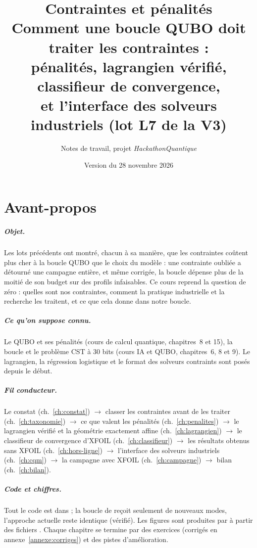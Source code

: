 \documentclass[11pt,a4paper]{report}
\title{\textbf{Contraintes et pénalités}\\[0.4em]\large Comment une boucle QUBO doit traiter les contraintes :\\ pénalités, lagrangien vérifié, classifieur de convergence,\\ et l'interface des solveurs industriels (lot L7 de la V3)}
\author{Notes de travail, projet \emph{HackathonQuantique}}
\date{Version du 28 novembre 2026}
\begin{document}
\maketitle
{}

\chapter*{Avant-propos}
\paragraph{Objet.} Les lots précédents ont montré, chacun à sa manière, que les contraintes coûtent plus cher à la boucle QUBO que le choix du modèle : une contrainte oubliée a détourné une campagne entière, et même corrigée, la boucle dépense plus de la moitié de son budget sur des profils infaisables. Ce cours reprend la question de zéro : quelles sont nos contraintes, comment la pratique industrielle et la recherche les traitent, et ce que cela donne dans notre boucle.

\paragraph{Ce qu'on suppose connu.} Le QUBO et ses pénalités (cours de calcul quantique, chapitres~8 et 15), la boucle et le problème CST à 30 bits (cours IA et QUBO, chapitres~6, 8 et 9). Le lagrangien, la régression logistique et le format des solveurs contraints sont posés depuis le début.

\paragraph{Fil conducteur.} Le constat (ch.~\ref{ch:constat}) $\to$ classer les contraintes avant de les traiter (ch.~\ref{ch:taxonomie}) $\to$ ce que valent les pénalités (ch.~\ref{ch:penalites}) $\to$ le lagrangien vérifié et la géométrie exactement affine (ch.~\ref{ch:lagrangien}) $\to$ le classifieur de convergence d'XFOIL (ch.~\ref{ch:classifieur}) $\to$ les résultats obtenus sans XFOIL (ch.~\ref{ch:hors-ligne}) $\to$ l'interface des solveurs industriels (ch.~\ref{ch:cqm}) $\to$ la campagne avec XFOIL (ch.~\ref{ch:campagne}) $\to$ bilan (ch.~\ref{ch:bilan}).

\paragraph{Code et chiffres.} Tout le code est dans  ; la boucle de  reçoit seulement de nouveaux modes, l'approche actuelle reste identique (vérifié). Les figures sont produites par  à partir des fichiers . Chaque chapitre se termine par des exercices (corrigés en annexe~\ref{annexe:corriges}) et des pistes d'amélioration.
\end{document}
